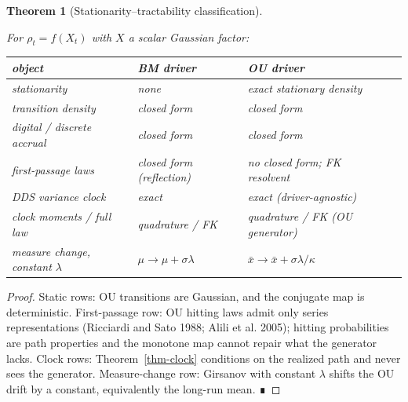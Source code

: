 \documentclass[
  english,
  10pt,
  letterpaper,
  DIV=11,
  numbers=noendperiod]{scrartcl}
\newcounter{none} %
\theoremstyle{plain}
\newtheorem{theorem}{Theorem}[section]
\theoremstyle{plain}
\theoremstyle{plain}
\theoremstyle{plain}
\theoremstyle{definition}
\theoremstyle{remark}
\begin{document}
\begin{theorem}[Stationarity--tractability
classification]\protect\hypertarget{thm-classification}{}\label{thm-classification}

For \(\rho_t=f(X_t)\) with \(X\) a scalar Gaussian factor:

{\def\LTcaptype{none} %
\begin{longtable}[]{@{}
  >{\raggedright\arraybackslash}p{}
  >{\raggedright\arraybackslash}p{}
  >{\raggedright\arraybackslash}p{}
  >{\raggedright\arraybackslash}p{}@{}}
\toprule\noalign{}
\begin{minipage}[b]{\linewidth}\raggedright
object
\end{minipage} & \begin{minipage}[b]{\linewidth}\raggedright
BM driver
\end{minipage} & \begin{minipage}[b]{\linewidth}\raggedright
OU driver
\end{minipage} & \begin{minipage}[b]{\linewidth}\raggedright
\end{minipage} \\
\midrule\noalign{}
\endhead
\bottomrule\noalign{}
\endlastfoot
stationarity & none & exact stationary density & \\
transition density & closed form & closed form & \\
digital / discrete accrual & closed form & closed form & \\
first-passage laws & closed form (reflection) & no closed form; FK
resolvent & \\
DDS variance clock & exact & exact (driver-agnostic) & \\
clock moments / full law & quadrature / FK & quadrature / FK (OU
generator) & \\
measure change, constant \(\lambda\) & \(\mu\to\mu+\sigma\lambda\) &
\(\bar x\to\bar x+\sigma\lambda/\kappa\) & \\
\end{longtable}
}

\end{theorem}

\begin{proof}
Static rows: OU transitions are Gaussian, and the conjugate map is
deterministic. First-passage row: OU hitting laws admit only series
representations (Ricciardi and Sato 1988; Alili et al. 2005); hitting
probabilities are path properties and the monotone map cannot repair
what the generator lacks. Clock rows: Theorem~\ref{thm-clock} conditions
on the realized path and never sees the generator. Measure-change row:
Girsanov with constant \(\lambda\) shifts the OU drift by a constant,
equivalently the long-run mean. ∎
\end{proof}
\end{document}
